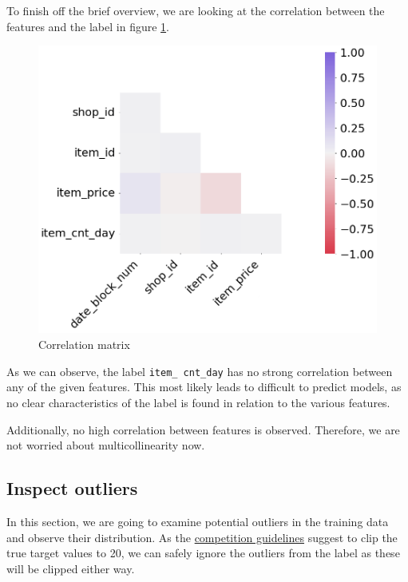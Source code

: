 To finish off the brief overview, we are looking at the correlation between the features and the label in figure \ref{corr_matrix}.

\begin{figure}
\centering
  \includegraphics[width=0.85\linewidth]{external_content/graphs/corr_matrix.png}
\captionsetup{justification=centering}
\caption{Correlation matrix}
\label{corr_matrix}
\end{figure}

\vspace*{6mm}
\noindent As we can observe, the label \texttt{item\_ cnt\_day} has no strong correlation between any of the given features. 
This most likely leads to difficult to predict models, as no clear characteristics of the label is found in relation to the various features.

\noindent Additionally, no high correlation between features is observed. Therefore, we are not worried about multicollinearity now. \cite{MultivariateStatistics}

\subsection{Inspect outliers}\label{sec:outliers}

In this section, we are going to examine potential outliers in the training data and observe their distribution. As the \href{https://www.kaggle.com/c/competitive-data-science-predict-future-sales/overview/evaluation}{competition guidelines} suggest to clip the true target values to 20, we can safely ignore the outliers from the label as these will be clipped either way.

